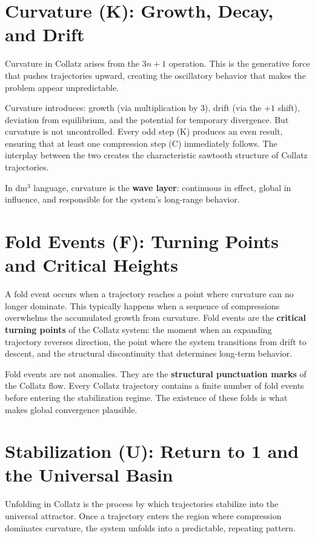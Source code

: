 \documentclass[14pt, twoside, openright]{book}
\theoremstyle{definition}
\theoremstyle{remark}
\begin{document}
\section{Curvature (K): Growth, Decay, and Drift}

Curvature in Collatz arises from the $3n+1$ operation. This is the generative
force that pushes trajectories upward, creating the oscillatory behavior that
makes the problem appear unpredictable.

Curvature introduces: growth (via multiplication by 3), drift (via the $+1$
shift), deviation from equilibrium, and the potential for temporary divergence.
But curvature is not uncontrolled. Every odd step (K) produces an even result,
ensuring that at least one compression step (C) immediately follows. The
interplay between the two creates the characteristic sawtooth structure of
Collatz trajectories.

In dm$^{3}$ language, curvature is the \textbf{wave layer}: continuous in
effect, global in influence, and responsible for the system's long-range behavior.

\section{Fold Events (F): Turning Points and Critical Heights}

A fold event occurs when a trajectory reaches a point where curvature can no
longer dominate. This typically happens when a sequence of compressions overwhelms
the accumulated growth from curvature. Fold events are the \textbf{critical
turning points} of the Collatz system: the moment when an expanding trajectory
reverses direction, the point where the system transitions from drift to descent,
and the structural discontinuity that determines long-term behavior.

Fold events are not anomalies. They are the \textbf{structural punctuation marks}
of the Collatz flow. Every Collatz trajectory contains a finite number of fold
events before entering the stabilization regime. The existence of these folds is
what makes global convergence plausible.

\section{Stabilization (U): Return to 1 and the Universal Basin}

Unfolding in Collatz is the process by which trajectories stabilize into the
universal attractor. Once a trajectory enters the region where compression
dominates curvature, the system unfolds into a predictable, repeating pattern.
\end{document}
